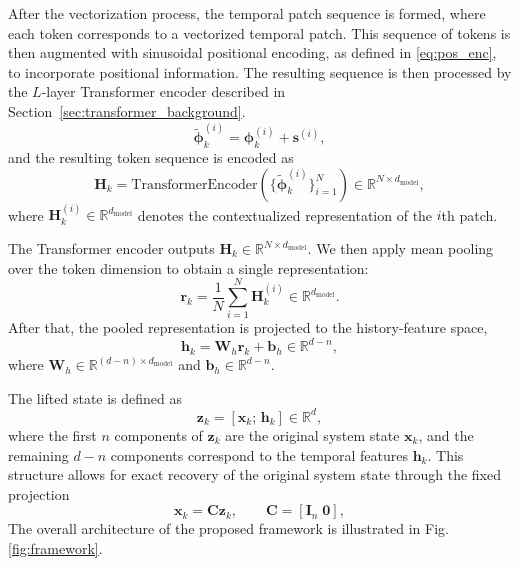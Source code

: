 \documentclass[journal]{IEEEtran}
\newcommand{\vx}{\mathbf{x}}
\newcommand{\vz}{\mathbf{z}}
\newcommand{\vh}{\mathbf{h}}
\newcommand{\vr}{\mathbf{r}}
\newcommand{\vs}{\mathbf{s}}
\newcommand{\vb}{\mathbf{b}}
\newcommand{\vphi}{\boldsymbol{\phi}}
\newcommand{\mC}{\mathbf{C}}
\newcommand{\mW}{\mathbf{W}}
\newcommand{\mH}{\mathbf{H}}
\newcommand{\mI}{\mathbf{I}}
\begin{document}
After the vectorization process, the temporal patch sequence is formed, where each token corresponds to a vectorized temporal patch. This sequence of tokens is then augmented with sinusoidal positional encoding, as defined in \eqref{eq:pos_enc}, to incorporate positional information. The resulting sequence is then processed by the $L$-layer Transformer encoder described in Section~\ref{sec:transformer_background}. 
\begin{equation}
    \tilde{\vphi}_k^{(i)} = \vphi_k^{(i)} + \vs^{(i)},
    \label{eq:pos_enc_applied}
\end{equation}
and the resulting token sequence is encoded as
\begin{equation}
    \mH_k = \mathrm{TransformerEncoder}\!\left(
        \{\tilde{\vphi}_k^{(i)}\}_{i=1}^{N}
    \right) \in \mathbb{R}^{N \times d_{\mathrm{model}}},
    \label{eq:transformer_enc}
\end{equation}
where $\mH_k^{(i)} \in \mathbb{R}^{d_{\mathrm{model}}}$ denotes the
contextualized representation of the $i$th patch.

 The Transformer encoder outputs $\mH_k \in \mathbb{R}^{N \times d_{\mathrm{model}}}$. We then apply mean pooling over
  the token dimension to obtain a single representation:
\begin{equation}
    \vr_k = \frac{1}{N}\sum_{i=1}^{N} \mH_k^{(i)}
    \in \mathbb{R}^{d_{\mathrm{model}}}.
    \label{eq:pooling}
\end{equation}
After that, the pooled representation is projected to the history-feature space,
\begin{equation}
    \vh_k = \mW_h \vr_k + \vb_h \in \mathbb{R}^{d-n},
    \label{eq:history_feature}
\end{equation}
where $\mW_h \in \mathbb{R}^{(d-n)\times d_{\mathrm{model}}}$ and
$\vb_h \in \mathbb{R}^{d-n}$.

The lifted state is defined as
\begin{equation}
    \vz_k = [\vx_k;\,\vh_k] \in \mathbb{R}^{d},
    \label{eq:lifted_state_form}
\end{equation}
where the first $n$ components of $\vz_k$ are the original system state $\vx_k$, and the remaining $d-n$ components correspond to the temporal features $\vh_k$. This structure allows for exact recovery of the original system state through the fixed projection
\begin{equation}
    \vx_k = \mC \vz_k, \qquad \mC = [\mI_n\;\mathbf{0}],
    \label{eq:decoder_projection}
\end{equation}
The overall architecture of the proposed framework is illustrated in Fig. \ref{fig:framework}.
\end{document}

